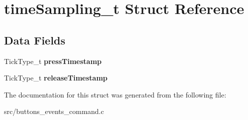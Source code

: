 \hypertarget{structtimeSampling__t}{}\section{time\+Sampling\+\_\+t Struct Reference}
\label{structtimeSampling__t}
\subsection*{Data Fields}
\begin{DoxyCompactItemize}
\item 
Tick\+Type\+\_\+t {\bfseries press\+Timestamp}\hypertarget{structtimeSampling__t_a3d4370e8effce825dfeff1a4ae4e691b}{}\label{structtimeSampling__t_a3d4370e8effce825dfeff1a4ae4e691b}

\item 
Tick\+Type\+\_\+t {\bfseries release\+Timestamp}\hypertarget{structtimeSampling__t_aa01456d4df88be503200556f20bbc961}{}\label{structtimeSampling__t_aa01456d4df88be503200556f20bbc961}

\end{DoxyCompactItemize}


The documentation for this struct was generated from the following file\+:\begin{DoxyCompactItemize}
\item 
src/buttons\+\_\+events\+\_\+command.\+c\end{DoxyCompactItemize}
